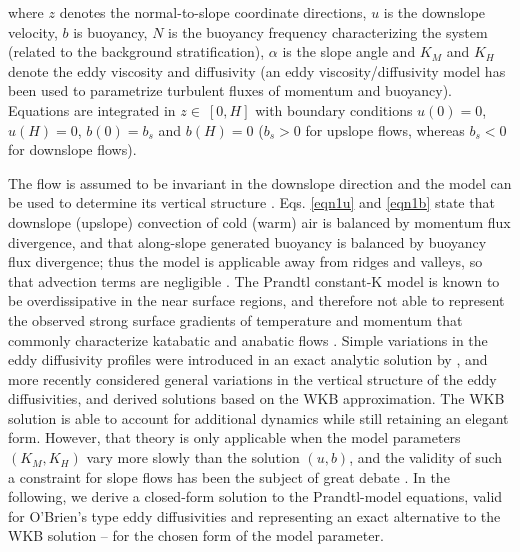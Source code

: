 %
where $z$ denotes the normal-to-slope coordinate directions, $u$ is the downslope velocity, $b$ is buoyancy, $N$ is the buoyancy frequency characterizing the system (related to the background stratification), $\alpha$ is the slope angle and $K_M$ and $K_H$ denote the eddy viscosity and diffusivity (an eddy viscosity/diffusivity model has been used to parametrize turbulent fluxes of momentum and buoyancy).
Equations are integrated in $z \in \ [0,H]$ with boundary conditions $u(0)=0$, $u(H) = 0$, $b(0)=b_s$ and $b(H) = 0$ ($b_s > 0$ for upslope flows, whereas $b_s<0$ for downslope flows). 

The flow is assumed to be invariant in the downslope direction and the model can be used to determine its vertical structure \citep{NAPPO1987}.
Eqs. \ref{eqn1u} and \ref{eqn1b} state that downslope (upslope) convection of cold (warm) air is balanced by momentum flux divergence, and that along-slope generated buoyancy is balanced by buoyancy flux divergence; thus the model is applicable away from ridges and valleys, so that advection terms are negligible \citep{NAPPO1987}.
The Prandtl constant-K model is known to be overdissipative in the near surface regions, and therefore not able to represent the observed strong surface gradients of temperature and momentum that commonly characterize katabatic and anabatic flows \citep{Oerlemans1998, grisogono2001katabatic}. 
Simple variations in the eddy diffusivity profiles were introduced in an exact analytic solution by \citet{gutman_1983}, and more recently \citet{grisogono2001katabatic} considered general variations in the vertical structure of the eddy diffusivities, and derived  solutions based on the WKB approximation.
The WKB solution is able to account for additional dynamics while still retaining an elegant form.
However, that theory is only applicable when the model parameters $(K_M, K_H)$ vary more slowly than the solution $(u,b)$, and the validity of such a constraint for slope flows has been the subject of great debate \citep{Grisogono2002}.
In the following, we derive a closed-form solution to the Prandtl-model equations, valid for O'Brien's type \citep{O'Brien1970} eddy diffusivities and representing an exact alternative to the WKB solution -- for the chosen form of the model parameter. 


